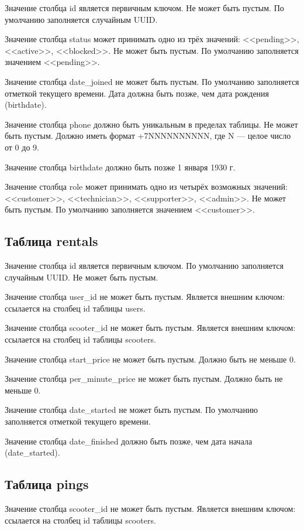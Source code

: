 Значение столбца id является первичным ключом. Не может быть пустым. По умолчанию заполняется случайным UUID.

Значение столбца status может принимать одно из трёх значений: <<pending>>, <<active>>, <<blocked>>. Не может быть пустым. По умолчанию заполняется значением <<pending>>.

Значение столбца date\_joined не может быть пустым. По умолчанию заполняется отметкой текущего времени. Дата должна быть позже, чем дата рождения (birthdate).

Значение столбца phone должно быть уникальным в пределах таблицы. Не может быть пустым. Должно иметь формат +7NNNNNNNNNN, где N --- целое число от 0 до 9.

Значение столбца birthdate должно быть позже 1 января 1930 г.

Значение столбца role может принимать одно из четырёх возможных значений: <<customer>>, <<technician>>, <<supporter>>, <<admin>>. Не может быть пустым. По умолчанию заполняется значением <<customer>>.

\subsection{Таблица rentals}

Значение столбца id является первичным ключом. По умолчанию заполняется случайным UUID. Не может быть пустым.

Значение столбца user\_id не может быть пустым. Является внешним ключом: ссылается на столбец id таблицы users.

Значение столбца scooter\_id не может быть пустым. Является внешним ключом: ссылается на столбец id таблицы scooters.

Значение столбца start\_price не может быть пустым. Должно быть не меньше 0.

Значение столбца per\_minute\_price не может быть пустым. Должно быть не меньше 0.

Значение столбца date\_started не может быть пустым. По умолчанию заполняется отметкой текущего времени.

Значение столбца date\_finished должно быть позже, чем дата начала (date\_started).

\subsection{Таблица pings}

Значение столбца scooter\_id не может быть пустым. Является внешним ключом: ссылается на столбец id таблицы scooters.

